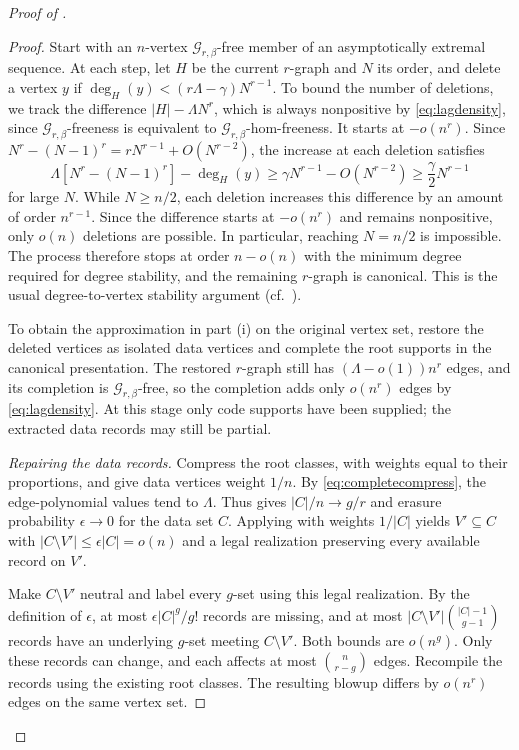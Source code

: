 \documentclass[10pt]{article}
\numberwithin{equation}{section}
\theoremstyle{definition}
\newcommand{\cG}{\mathcal G}\newcommand{\cH}{\mathcal H}\newcommand{\cJ}{\mathcal J}
\begin{document}
\begin{proof}[Proof of ]
\begin{proof}
Start with an $n$-vertex $\cG_{r,\beta}$-free member of an asymptotically extremal sequence. At each step, let $H$ be the current $r$-graph and $N$ its order, and delete a vertex $y$ if $\deg_H(y)<(r\Lambda-\gamma)N^{r-1}$. To bound the number of deletions, we track the difference $|H|-\Lambda N^r$, which is always nonpositive by \eqref{eq:lagdensity}, since $\cG_{r,\beta}$-freeness is equivalent to $\cG_{r,\beta}$-hom-freeness. It starts at $-o(n^r)$. Since $N^r-(N-1)^r=rN^{r-1}+O(N^{r-2})$, the increase at each deletion satisfies
\[
 \Lambda[N^r-(N-1)^r]-\deg_H(y)
 \ge\gamma N^{r-1}-O(N^{r-2})\ge\frac\gamma2N^{r-1}
\]
for large $N$. While $N\ge n/2$, each deletion increases this difference by an amount of order $n^{r-1}$. Since the difference starts at $-o(n^r)$ and remains nonpositive, only $o(n)$ deletions are possible. In particular, reaching $N=n/2$ is impossible. The process therefore stops at order $n-o(n)$ with the minimum degree required for degree stability, and the remaining $r$-graph is canonical. This is the usual degree-to-vertex stability argument (cf.\ \cite[Fact 2.5]{LMR2023}).

To obtain the approximation in part \textup{(i)} on the original vertex set, restore the deleted vertices as isolated data vertices and complete the root supports in the canonical presentation. The restored $r$-graph still has $(\Lambda-o(1))n^r$ edges, and its completion is $\cG_{r,\beta}$-free, so the completion adds only $o(n^r)$ edges by \eqref{eq:lagdensity}. At this stage only code supports have been supplied; the extracted data records may still be partial.

\emph{Repairing the data records.} Compress the root classes, with weights equal to their proportions, and give data vertices weight $1/n$. By \eqref{eq:completecompress}, the edge-polynomial values tend to $\Lambda$. Thus  gives $|C|/n\to g/r$ and erasure probability $\epsilon\to0$ for the data set $C$. Applying  with weights $1/|C|$ yields $V'\subseteq C$ with $|C\setminus V'|\le\epsilon|C|=o(n)$ and a legal realization preserving every available record on $V'$.

Make $C\setminus V'$ neutral and label every $g$-set using this legal realization. By the definition of $\epsilon$, at most $\epsilon|C|^g/g!$ records are missing, and at most $|C\setminus V'|\binom{|C|-1}{g-1}$ records have an underlying $g$-set meeting $C\setminus V'$. Both bounds are $o(n^g)$. Only these records can change, and each affects at most $\binom n{r-g}$ edges. Recompile the records using the existing root classes. The resulting blowup differs by $o(n^r)$ edges on the same vertex set.


\end{proof}
\end{proof}
\end{document}
